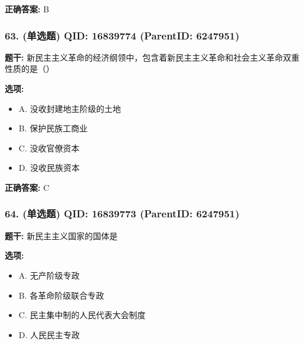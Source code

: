 \documentclass[12pt,UTF8]{ctexart}
\begin{document}
\textbf{正确答案:}
B

\vspace{0.3em}\hrulefill\vspace{0.7em}

\subsubsection*{63. (单选题) \small QID: 16839774 (ParentID: 6247951)}

\textbf{题干:}
新民主主义革命的经济纲领中，包含着新民主主义革命和社会主义革命双重性质的是（）



\textbf{选项:}
\begin{itemize}[leftmargin=*]

  \item A. 没收封建地主阶级的土地

  \item B. 保护民族工商业

  \item C. 没收官僚资本

  \item D. 没收民族资本

\end{itemize}

\textbf{正确答案:}
C

\vspace{0.3em}\hrulefill\vspace{0.7em}

\subsubsection*{64. (单选题) \small QID: 16839773 (ParentID: 6247951)}

\textbf{题干:}
新民主主义国家的国体是



\textbf{选项:}
\begin{itemize}[leftmargin=*]

  \item A. 无产阶级专政

  \item B. 各革命阶级联合专政

  \item C. 民主集中制的人民代表大会制度

  \item D. 人民民主专政

\end{itemize}
\end{document}
